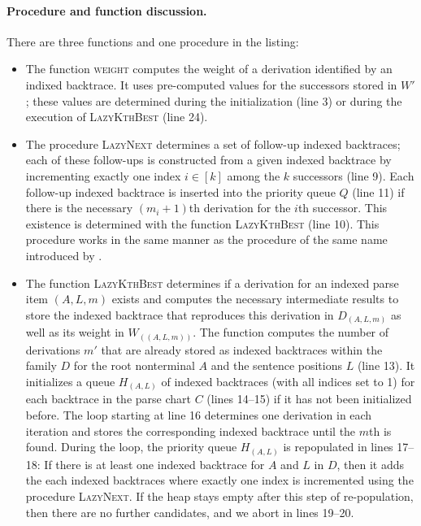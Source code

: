 \documentclass[../../document.tex]{subfiles}
\begin{document}
    \paragraph{Procedure and function discussion.}
    There are three functions and one procedure in the listing:
    \begin{itemize}
        \item The function \textsc{weight} computes the weight of a derivation identified by an indixed backtrace.
            It uses pre-computed values for the successors stored in \(W'\); these values are determined during the initialization (line 3) or during the execution of \textsc{LazyKthBest} (line 24).
        \item The procedure \textsc{LazyNext} determines a set of follow-up indexed backtraces; each of these follow-ups is constructed from a given indexed backtrace by incrementing exactly one index \(i \in [k]\) among the \(k\) successors (line 9).
            Each follow-up indexed backtrace is inserted into the priority queue \(Q\) (line 11) if there is the necessary \((m_i+1)\)th derivation for the \(i\)th successor.
            This existence is determined with the function \textsc{LazyKthBest} (line 10).
            This procedure works in the same manner as the procedure of the same name introduced by .
        \item The function \textsc{LazyKthBest} determines if a derivation for an indexed parse item \((A, L, m)\) exists and computes the necessary intermediate results to store the indexed backtrace that reproduces this derivation in \(D_{(A, L, m)}\) as well as its weight in \(W_{((A, L, m))}\).
            The function computes the number of derivations \(m'\) that are already stored as indexed backtraces within the family \(D\) for the root nonterminal \(A\) and the sentence positions \(L\) (line 13).
            It initializes a queue \(H_{(A, L)}\) of indexed backtraces (with all indices set to 1) for each backtrace in the parse chart \(C\) (lines 14--15) if it has not been initialized before.
            The loop starting at line 16 determines one derivation in each iteration and stores the corresponding indexed backtrace until the \(m\)th is found.
            During the loop, the priority queue \(H_{(A, L)}\) is repopulated in lines 17--18:
                If there is at least one indexed backtrace for \(A\) and \(L\) in \(D\), then it adds the each indexed backtraces where exactly one index is incremented using the procedure \textsc{LazyNext}.
            If the heap stays empty after this step of re-population, then there are no further candidates, and we abort in lines 19--20.

\end{itemize}
\end{document}
